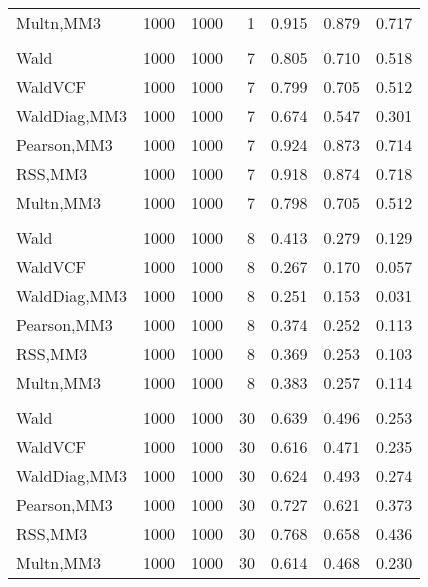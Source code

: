 \documentclass[
]{article}
\begin{document}
\begin{table}[H]
{\begin{tabular}[t]{lrrrrrr}
\hspace{1em}Multn,MM3 & 1000 & 1000 & 1 & 0.915 & 0.879 & 0.717\\
\addlinespace[0.3em]
\multicolumn{7}{l}{\textbf{1F 15V}}\\
\hspace{1em}Wald & 1000 & 1000 & 7 & 0.805 & 0.710 & 0.518\\
\hspace{1em}WaldVCF & 1000 & 1000 & 7 & 0.799 & 0.705 & 0.512\\
\hspace{1em}WaldDiag,MM3 & 1000 & 1000 & 7 & 0.674 & 0.547 & 0.301\\
\hspace{1em}Pearson,MM3 & 1000 & 1000 & 7 & 0.924 & 0.873 & 0.714\\
\hspace{1em}RSS,MM3 & 1000 & 1000 & 7 & 0.918 & 0.874 & 0.718\\
\hspace{1em}Multn,MM3 & 1000 & 1000 & 7 & 0.798 & 0.705 & 0.512\\
\addlinespace[0.3em]
\multicolumn{7}{l}{\textbf{2F 10V}}\\
\hspace{1em}Wald & 1000 & 1000 & 8 & 0.413 & 0.279 & 0.129\\
\hspace{1em}WaldVCF & 1000 & 1000 & 8 & 0.267 & 0.170 & 0.057\\
\hspace{1em}WaldDiag,MM3 & 1000 & 1000 & 8 & 0.251 & 0.153 & 0.031\\
\hspace{1em}Pearson,MM3 & 1000 & 1000 & 8 & 0.374 & 0.252 & 0.113\\
\hspace{1em}RSS,MM3 & 1000 & 1000 & 8 & 0.369 & 0.253 & 0.103\\
\hspace{1em}Multn,MM3 & 1000 & 1000 & 8 & 0.383 & 0.257 & 0.114\\
\addlinespace[0.3em]
\multicolumn{7}{l}{\textbf{3F 15V}}\\
\hspace{1em}Wald & 1000 & 1000 & 30 & 0.639 & 0.496 & 0.253\\
\hspace{1em}WaldVCF & 1000 & 1000 & 30 & 0.616 & 0.471 & 0.235\\
\hspace{1em}WaldDiag,MM3 & 1000 & 1000 & 30 & 0.624 & 0.493 & 0.274\\
\hspace{1em}Pearson,MM3 & 1000 & 1000 & 30 & 0.727 & 0.621 & 0.373\\
\hspace{1em}RSS,MM3 & 1000 & 1000 & 30 & 0.768 & 0.658 & 0.436\\
\hspace{1em}Multn,MM3 & 1000 & 1000 & 30 & 0.614 & 0.468 & 0.230\\
\bottomrule
\end{tabular}}
\endgroup{}
\end{table}
\end{document}
